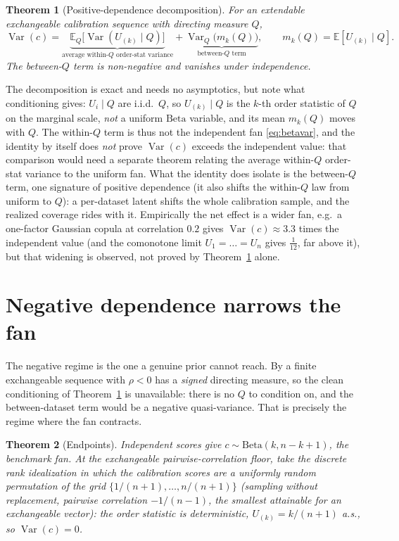 \documentclass[11pt]{article}
\newtheorem{theorem}{Theorem}
\begin{document}
\begin{theorem}[Positive-dependence decomposition]\label{thm:pos}
For an extendable exchangeable calibration sequence with directing measure $Q$,
\begin{equation}
\operatorname{Var}(c)=\underbrace{\mathbb E_Q\!\big[\operatorname{Var}(U_{(k)}\mid Q)\big]}
_{\text{average within-}Q\text{ order-stat variance}}
+\underbrace{\operatorname{Var}_Q\!\big(m_k(Q)\big)}_{\text{between-}Q\text{ term}},
\qquad m_k(Q)=\mathbb E[U_{(k)}\mid Q].
\end{equation}
The between-$Q$ term is non-negative and vanishes under independence.
\end{theorem}

The decomposition is exact and needs no asymptotics, but note what conditioning gives: $U_i\mid Q$ are
i.i.d.\ $Q$, so $U_{(k)}\mid Q$ is the $k$-th order statistic of $Q$ on the marginal scale, \emph{not}
a uniform $\mathrm{Beta}$ variable, and its mean $m_k(Q)$ moves with $Q$. The within-$Q$ term is thus
not the independent fan \eqref{eq:betavar}, and the identity by itself does \emph{not} prove
$\operatorname{Var}(c)$ exceeds the independent value: that comparison would need a separate theorem
relating the average within-$Q$ order-stat variance to the uniform fan. What the identity does isolate
is the between-$Q$ term, one signature of positive dependence (it also shifts the within-$Q$ law from
uniform to $Q$): a per-dataset latent shifts the whole
calibration sample, and the realized coverage rides with it. Empirically the net effect is a wider
fan, e.g.\ a one-factor Gaussian copula at correlation $0.2$ gives $\operatorname{Var}(c)\approx 3.3$
times the independent value (and the comonotone limit $U_1=\dots=U_n$ gives $\tfrac1{12}$, far above
it), but that widening is observed, not proved by Theorem~\ref{thm:pos} alone.

\section{Negative dependence narrows the fan}

The negative regime is the one a genuine prior cannot reach. By \citet{kerns2006} a finite
exchangeable sequence with $\rho<0$ has a \emph{signed} directing measure, so the clean conditioning
of Theorem~\ref{thm:pos} is unavailable: there is no $Q$ to condition on, and the between-dataset
term would be a negative quasi-variance. That is precisely the regime where the fan contracts.

\begin{theorem}[Endpoints]\label{thm:ends}
Independent scores give $c\sim\mathrm{Beta}(k,n-k+1)$, the benchmark fan. At the exchangeable
pairwise-correlation floor, take the discrete rank idealization in which the calibration scores are a
uniformly random permutation of the grid $\{1/(n+1),\dots,n/(n+1)\}$ (sampling without replacement,
pairwise correlation $-1/(n-1)$, the smallest attainable for an exchangeable vector): the order
statistic is deterministic, $U_{(k)}=k/(n+1)$ a.s., so $\operatorname{Var}(c)=0$.
\end{theorem}
\end{document}
